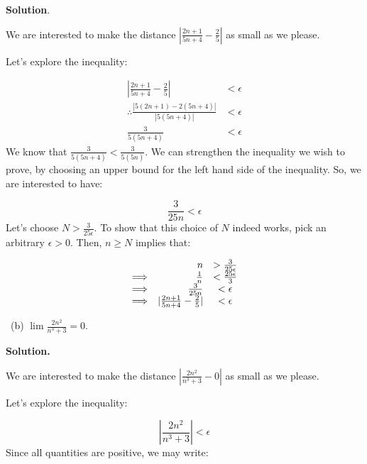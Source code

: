 \documentclass[10pt]{article}
\begin{document}
\textbf{Solution}.



We are interested to make the distance $\displaystyle |\frac{2n+1}{5n+4} -\frac{2}{5} |$ as small as we please. 

Let's explore the inequality:


\begin{equation*}
\begin{aligned}
|\frac{2n+1}{5n+4} -\frac{2}{5} | & < \epsilon \\
\therefore \frac{|5( 2n+1) -2( 5n+4) |}{|5( 5n+4) |} & < \epsilon \\
\frac{3}{5( 5n+4)} & < \epsilon 
\end{aligned}
\end{equation*}
We know that $\displaystyle \frac{3}{5( 5n+4)} < \frac{3}{5( 5n)}$. We can strengthen the inequality we wish to prove, by choosing an upper bound for the left hand side of the inequality. So, we are interested to have:


\begin{equation*}
\frac{3}{25n} < \epsilon 
\end{equation*}
Let's choose $\displaystyle N >\frac{3}{25\epsilon }$. To show that this choice of $\displaystyle N$ indeed works, pick an arbitrary $\displaystyle \epsilon  >0$. Then, $\displaystyle n\geq N$ implies that:


\begin{equation*}
\begin{array}{ r r c }
 & n &  >\frac{3}{25\epsilon }\\
\Longrightarrow  & \frac{1}{n} & < \frac{25\epsilon }{3}\\
\Longrightarrow  & \frac{3}{25n} & < \epsilon \\
\Longrightarrow  & |\frac{2n+1}{5n+4} -\frac{2}{5} | & < \epsilon 
\end{array}
\end{equation*}


 \ (b) $\displaystyle \lim \frac{2n^{2}}{n^{3} +3} =0$.



\textbf{Solution.}



We are interested to make the distance $\displaystyle |\frac{2n^{2}}{n^{3} +3} -0|$ as small as we please. 



Let's explore the inequality:


\begin{equation*}
|\frac{2n^{2}}{n^{3} +3} |< \epsilon 
\end{equation*}
Since all quantities are positive, we may write:
\end{document}
